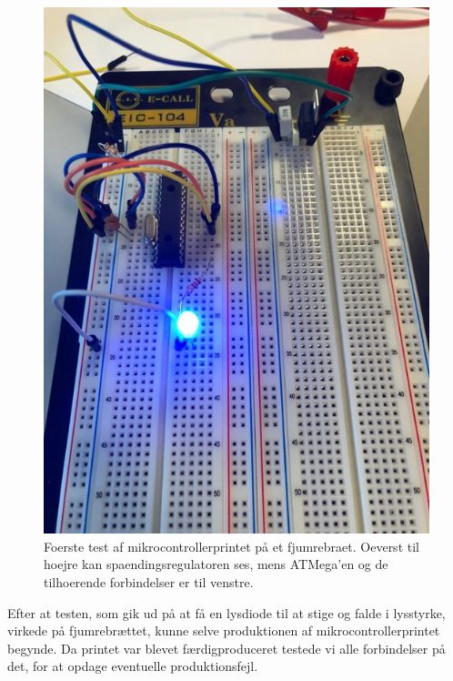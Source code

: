 \begin{figure}[H]
\centering
\includegraphics[scale=0.4]{Billeder/Fjumrebraet.jpg}
\caption{  Foerste test af mikrocontrollerprintet på et fjumrebraet. Oeverst til hoejre kan spaendingsregulatoren ses, mens ATMega’en og de tilhoerende forbindelser er til venstre.}
\label{fig:fjumrebraet}
\end{figure}

Efter at testen, som gik ud på at få en lysdiode til at stige og falde i lysstyrke, virkede på fjumrebrættet, kunne selve produktionen af mikrocontrollerprintet begynde. Da printet var blevet færdigproduceret testede vi alle forbindelser på det, for at opdage eventuelle produktionsfejl.

